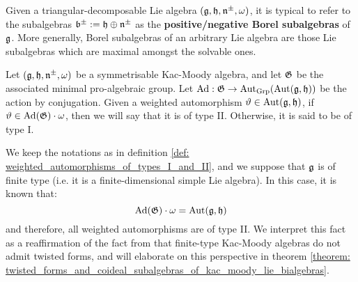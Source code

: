         Given a triangular-decomposable Lie algebra $(\mathfrak{g}, \mathfrak{h}, \mathfrak{n}^{\pm}, \omega)$, it is typical to refer to the subalgebras $\mathfrak{b}^{\pm} := \mathfrak{h} \oplus \mathfrak{n}^{\pm}$ as the \textbf{positive/negative Borel subalgebras} of $\mathfrak{g}$. More generally, Borel subalgebras of an arbitrary Lie algebra are those Lie subalgebras which are maximal amongst the solvable ones.

        \begin{proposition} \label{prop: minimal_kac_moody_groups}
        \end{proposition}

        \begin{definition} \label{def: weighted_automorphisms_of_types_I_and_II}
            Let $(\mathfrak{g}, \mathfrak{h}, \mathfrak{n}^{\pm}, \omega)$ be a symmetrisable Kac-Moody algebra, and let $\mathfrak{G}$ be the associated minimal pro-algebraic group. Let $\mathrm{Ad}: \mathfrak{G} \to \operatorname{Aut}_{\mathrm{Grp}}( \operatorname{Aut}(\mathfrak{g}, \mathfrak{h}) )$ be the action by conjugation. Given a weighted automorphism $\vartheta \in \operatorname{Aut}(\mathfrak{g}, \mathfrak{h})$, if $\vartheta \in \mathrm{Ad}(\mathfrak{G}) \cdot \omega$, then we will say that it is of type II. Otherwise, it is said to be of type I.
        \end{definition}
        \begin{remark} \label{remark: finite_type_kac_moody_algebras_only_have_type_II_weighted_automorphisms}
            We keep the notations as in definition \ref{def: weighted_automorphisms_of_types_I_and_II}, and we suppose that $\mathfrak{g}$ is of finite type (i.e. it is a finite-dimensional simple Lie algebra). In this case, it is known that:
                $$\mathrm{Ad}(\mathfrak{G}) \cdot \omega = \operatorname{Aut}(\mathfrak{g}, \mathfrak{h})$$
            and therefore, all weighted automorphisms are of type II. We interpret this fact as a reaffirmation of the fact from \cite[Chapter 8]{kac_infinite_dimensional_lie_algebras} that finite-type Kac-Moody algebras do not admit twisted forms, and will elaborate on this perspective in theorem \ref{theorem: twisted_forms_and_coideal_subalgebras_of_kac_moody_lie_bialgebras}. 
        \end{remark}